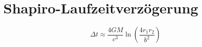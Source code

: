 \section{Shapiro-Laufzeitverzögerung}
\[ \Delta t \approx \frac{4GM}{c^3} \ln\left(\frac{4r_1 r_2}{b^2}\right) \]